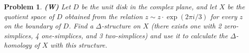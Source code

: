 
\usepackage[T1]{fontenc}
\usepackage{tikz-cd}

\usepackage{thmtools}
\usepackage{fancyhdr}

\usepackage{csquotes}
\newsavebox{\myheadbox}
{
\cfoot{\thepage}
}
\fancyhf{}
{
\cfoot{\thepage}
}

\pagestyle{normalpage}

\date{}

\newcommand{\Set}{\mathsf{Set}}
\renewcommand{\C}{\mathsf{C}}
\renewcommand{\Im}{\mathsf{Im}}
\newcommand{\Ker}{\mathsf{Ker}}
\newcommand{\Rank}{\mathsf{Rank}}

\thispagestyle{firstpage}
\theoremstyle{normalhead}
\newtheorem{problem}{Problem}
\newtheorem{lemma}{Lemma}


\begin{problem}
\textbf{(W)} Let $D$ be the unit disk in the complex plane, and let $X$ be the quotient space of $D$ obtained from the relation $z \sim z \cdot \exp(2\pi i/3)$ for every $z$ on the boundary of $D$. Find a $\Delta$-structure on $X$ (there exists one with 2 zero-simplices, 4 one-simplices, and 3 two-simplices) and use it to calculate the $\Delta$-homology of $X$ with this structure.
\end{problem}

